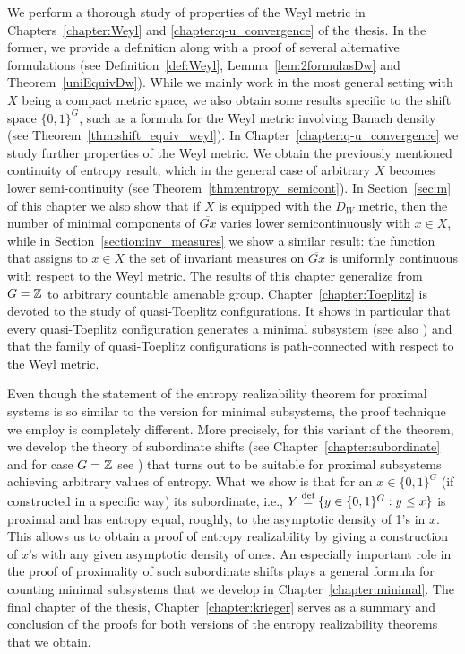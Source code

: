 We perform a thorough study of properties of the Weyl metric in Chapters~\ref{chapter:Weyl} and \ref{chapter:q-u_convergence} of the thesis.
%
In the former, we provide a definition along with a proof of several alternative formulations (see Definition~\ref{def:Weyl}, Lemma~\ref{lem:2formulasDw} and Theorem~\ref{uniEquivDw}).
%
While we mainly work in the most general setting with $X$ being a compact metric space, we also obtain some results specific to the shift space $\{0,1\}^G$, such as a formula for the Weyl metric involving Banach density (see Theorem~\ref{thm:shift_equiv_weyl}).
%
In Chapter~\ref{chapter:q-u_convergence} we study further properties of the Weyl metric.
%
We obtain the previously mentioned continuity of entropy result, which in the general case of arbitrary $X$ becomes lower semi-continuity (see Theorem~\ref{thm:entropy_semicont}).
%
In Section~\ref{sec:m} of this chapter we also show that if $X$ is equipped with the $D_W$ metric, then the number of minimal components of $\overline{Gx}$ varies lower semicontinuously with $x\in X$, while in Section~\ref{section:inv_measures} we show a similar result: the function that assigns to $x\in X$ the set of invariant measures on $\overline{Gx}$ is uniformly continuous with respect to the Weyl metric. 
%
The results of this chapter generalize \cite{DI88} from $G=\mathbb{Z}$ to arbitrary countable amenable group.
%
Chapter~\ref{chapter:Toeplitz} is devoted to the study of quasi-Toeplitz configurations.
%
It shows in particular that every quasi-Toeplitz configuration generates a minimal subsystem (see also \cite{CC19}) and that the family of quasi-Toeplitz configurations is path-connected with respect to the Weyl metric.
%

Even though the statement of the entropy realizability theorem for proximal systems is so similar to the version for minimal subsystems, the proof technique we employ is completely different.
%
More precisely, for this variant of the theorem, we develop the theory of subordinate shifts (see Chapter~\ref{chapter:subordinate} and for case $G=\mathbb{Z}$ see \cite{KKL18}) that turns out to be suitable for proximal subsystems achieving arbitrary values of entropy.
%
What we show is that for an $x\in \{0,1\}^G$ (if constructed in a specific way) its subordinate, i.e., $Y\stackrel{\textup{def}}{=} \{y\in \{0,1\}^G: y\leq x \}$ is proximal and has entropy equal, roughly, to the asymptotic density of 1's in $x$.
%
This allows us to obtain a proof of entropy realizability by giving a construction of $x$'s with any given asymptotic density of ones.
%
An especially important role in the proof of proximality of such subordinate shifts plays a general formula for counting minimal subsystems that we develop in Chapter~\ref{chapter:minimal}.
%
The final chapter of the thesis, Chapter~\ref{chapter:krieger} serves as a summary and conclusion of the proofs for both versions of the entropy realizability theorems that we obtain.




